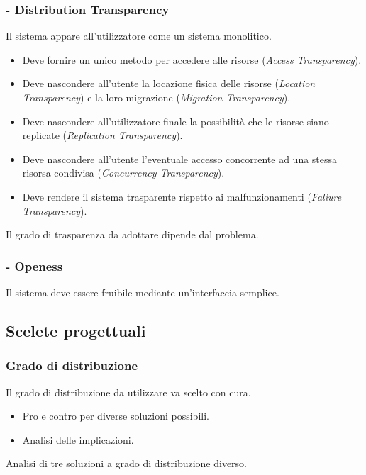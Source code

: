 \documentclass[slidestop,compress,blackandwhite]{beamer}
\newcommand{\ii}[1]{\textit{#1}}
\begin{document}
	\begin{frame}
		\frametitle{ - Distribution Transparency}
		
		Il sistema appare all'utilizzatore come un sistema monolitico.
		\begin{itemize}
			\item Deve fornire un unico metodo per accedere alle risorse (\ii{Access Transparency}).
			\item Deve nascondere all'utente la locazione fisica delle risorse (\ii{Location Transparency}) e la loro migrazione (\ii{Migration Transparency}).
			\item Deve nascondere all'utilizzatore finale la possibilità che le risorse siano replicate (\ii{Replication Transparency}).
			\item Deve nascondere all'utente l'eventuale accesso concorrente ad una stessa risorsa condivisa (\ii{Concurrency Transparency}).
			\item Deve rendere il sistema trasparente rispetto ai malfunzionamenti (\ii{Faliure Transparency}).
		\end{itemize}
		
		Il grado di trasparenza da adottare dipende dal problema.
		
	\end{frame}
	
	\begin{frame}
		\frametitle{ - Openess}
		Il sistema deve essere fruibile mediante un'interfaccia semplice.
		
	\end{frame}

	
	\subsection{Scelete progettuali}
	\begin{frame}
		\frametitle{Grado di distribuzione}
		
		Il grado di distribuzione da utilizzare va scelto con cura.
		\begin{itemize}
			\item Pro e contro per diverse soluzioni possibili.
			\item Analisi delle implicazioni.
		\end{itemize}
		
		Analisi di tre soluzioni a grado di distribuzione diverso. 
		
	\end{frame}
	
\end{document}
